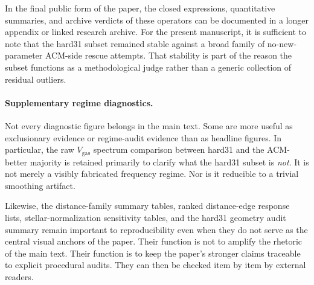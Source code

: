 ﻿\documentclass[aps,prd,twocolumn,superscriptaddress,longbibliography,nofootinbib,floatfix,10pt]{revtex4-2}
\begin{document}
In the final public form of the paper, the closed expressions, quantitative
summaries, and archive verdicts of these operators can be documented in a
longer appendix or linked research archive. For the present manuscript, it is
sufficient to note that the hard31 subset remained stable against a broad
family of no-new-parameter ACM-side rescue attempts. That stability is part
of the reason the subset functions as a methodological judge rather than a
generic collection of residual outliers.

\paragraph*{Supplementary regime diagnostics.}
Not every diagnostic figure belongs in the main text. Some are more useful as
exclusionary evidence or regime-audit evidence than as headline figures. In
particular, the raw $V_{\mathrm{gas}}$ spectrum comparison between hard31 and
the ACM-better majority is retained primarily to clarify what the hard31
subset is \emph{not}. It is not merely a visibly fabricated frequency regime.
Nor is it reducible to a trivial smoothing artifact.

Likewise, the distance-family summary tables, ranked distance-edge response
lists, stellar-normalization sensitivity tables, and the hard31 geometry
audit summary remain important to reproducibility even when they do not serve
as the central visual anchors of the paper. Their function is not to amplify
the rhetoric of the main text. Their function is to keep the paper's
stronger claims traceable to explicit procedural audits. They can then be
checked item by item by external readers.



\end{document}

